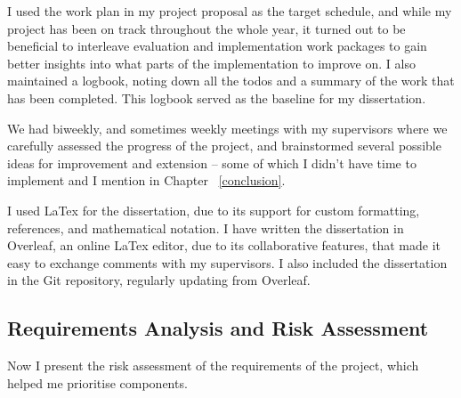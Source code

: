 I used the work plan in my project proposal as the target schedule, and while my project has been on track throughout the whole year, it turned out to be beneficial to interleave evaluation and implementation work packages to gain better insights into what parts of the implementation to improve on. I also maintained a logbook, noting down all the todos and a summary of the work that has been completed. This logbook served as the baseline for my dissertation.

We had biweekly, and sometimes weekly meetings with my supervisors where we carefully assessed the progress of the project, and brainstormed several possible ideas for improvement and extension -- some of which I didn't have time to implement and I mention in Chapter ~\ref{conclusion}.

I used LaTex for the dissertation, due to its support for custom formatting, references, and mathematical notation. I have written the dissertation in Overleaf, an online LaTex editor, due to its collaborative features, that made it easy to exchange comments with my supervisors. I also included the dissertation in the Git repository, regularly updating from Overleaf.

\fi

\subsection{Requirements Analysis and Risk Assessment}

Now I present the risk assessment of the requirements of the project, which helped me prioritise components.


